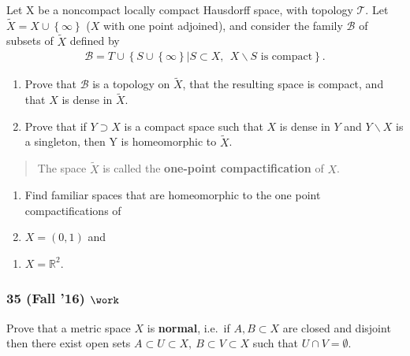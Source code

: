 \begin{problem}[?]

Let X be a noncompact locally compact Hausdorff space, with topology
\({\mathcal{T}}\). Let \(\tilde X = X \cup \left\{{\infty}\right\}\)
(\(X\) with one point adjoined), and consider the family
\({\mathcal{B}}\) of subsets of \(\tilde X\) defined by
\begin{align*}
{\mathcal{B}}= T \cup \left\{{S \cup \left\{{\infty}\right\}\mathrel{\Big|}S \subset X,~~ X \backslash S \text{ is compact}}\right\}
.\end{align*}

\begin{enumerate}
\def\labelenumi{\alph{enumi}.}
\item
  Prove that \({\mathcal{B}}\) is a topology on \(\tilde X\), that the
  resulting space is compact, and that \(X\) is dense in \(\tilde X\).
\item
  Prove that if \(Y \supset X\) is a compact space such that \(X\) is
  dense in \(Y\) and \(Y \backslash X\) is a singleton, then Y is
  homeomorphic to \(\tilde X\).
\end{enumerate}

\begin{quote}
The space \(\tilde X\) is called the \textbf{one-point compactification}
of \(X\).
\end{quote}

\begin{enumerate}
\def\labelenumi{\alph{enumi}.}
\setcounter{enumi}{2}
\item
  Find familiar spaces that are homeomorphic to the one point
  compactifications of
\item
  \(X = (0, 1)\) and
\end{enumerate}

\begin{enumerate}
\def\labelenumi{\roman{enumi}.}
\setcounter{enumi}{1}
\tightlist
\item
  \(X = {\mathbb{R}}^2\).
\end{enumerate}

\end{problem}

\hypertarget{fall-16-work-1}{%
\subsubsection{\texorpdfstring{35 (Fall '16)
\(\work\)}{35 (Fall '16) \textbackslash work}}\label{fall-16-work-1}}

\begin{problem}[?]

Prove that a metric space \(X\) is \textbf{normal}, i.e.~if
\(A, B \subset X\) are closed and disjoint then there exist open sets
\(A \subset U \subset X, ~B \subset V \subset X\) such that
\(U \cap V = \emptyset\).

\end{problem}

